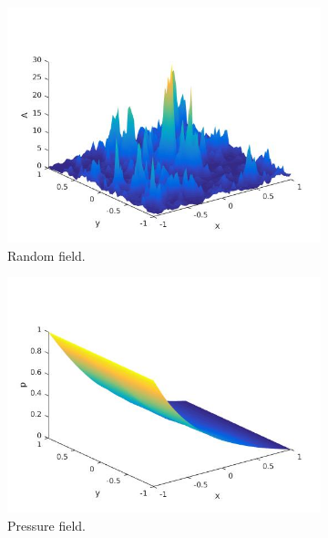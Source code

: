 \begin{figure}[t]
    \centering
    \begin{subfigure}{0.49\linewidth}
        \centering
        \includegraphics [width=1\linewidth]{Darcy/Pictures/A.jpg}
        \caption{Random field.}
        \label{fig:DarcyA}
    \end{subfigure}
    \begin{subfigure}{0.49\linewidth}
        \centering
        \includegraphics [width=1\linewidth]{Darcy/Pictures/P.jpg}
        \caption{Pressure field.}
        \label{fig:DarcyP}
    \end{subfigure}    
    \begin{subfigure}{0.49\linewidth}
        \centering

\end{subfigure}
\end{figure}
